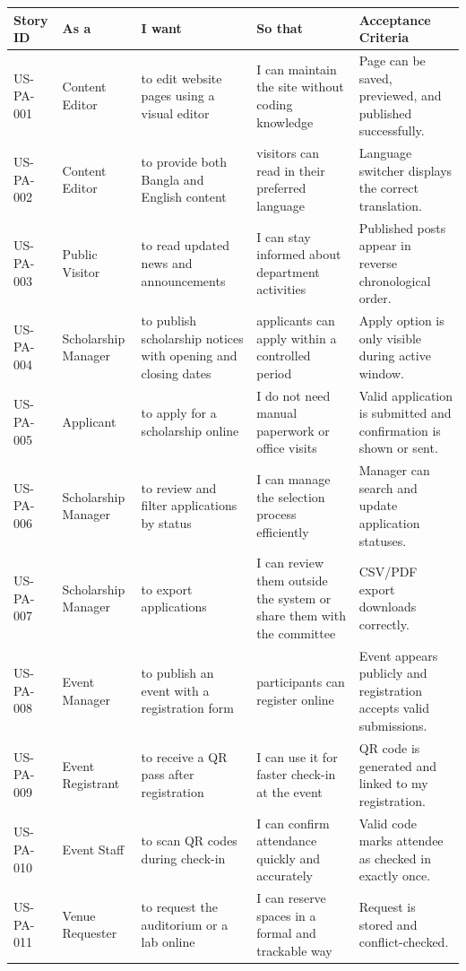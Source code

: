 \documentclass[12pt,a4paper]{article}
\newcommand{\thead}[1]{\textbf{\color{white}#1}}
\newcommand{\theadrow}{\rowcolor{headerblue}}
\begin{document}
\begin{longtable}{@{}L{1.9cm}L{2.5cm}L{3.4cm}L{3.7cm}L{3.2cm}@{}}
\theadrow \thead{Story ID} & \thead{As a} & \thead{I want} & \thead{So that} & \thead{Acceptance Criteria} \\
\endhead
US-PA-001 & Content Editor & to edit website pages using a visual editor & I can maintain the site without coding knowledge & Page can be saved, previewed, and published successfully. \\
US-PA-002 & Content Editor & to provide both Bangla and English content & visitors can read in their preferred language & Language switcher displays the correct translation. \\
US-PA-003 & Public Visitor & to read updated news and announcements & I can stay informed about department activities & Published posts appear in reverse chronological order. \\
US-PA-004 & Scholarship Manager & to publish scholarship notices with opening and closing dates & applicants can apply within a controlled period & Apply option is only visible during active window. \\
US-PA-005 & Applicant & to apply for a scholarship online & I do not need manual paperwork or office visits & Valid application is submitted and confirmation is shown or sent. \\
US-PA-006 & Scholarship Manager & to review and filter applications by status & I can manage the selection process efficiently & Manager can search and update application statuses. \\
US-PA-007 & Scholarship Manager & to export applications & I can review them outside the system or share them with the committee & CSV/PDF export downloads correctly. \\
US-PA-008 & Event Manager & to publish an event with a registration form & participants can register online & Event appears publicly and registration accepts valid submissions. \\
US-PA-009 & Event Registrant & to receive a QR pass after registration & I can use it for faster check-in at the event & QR code is generated and linked to my registration. \\
US-PA-010 & Event Staff & to scan QR codes during check-in & I can confirm attendance quickly and accurately & Valid code marks attendee as checked in exactly once. \\
US-PA-011 & Venue Requester & to request the auditorium or a lab online & I can reserve spaces in a formal and trackable way & Request is stored and conflict-checked. \\

\end{longtable}
\end{document}
